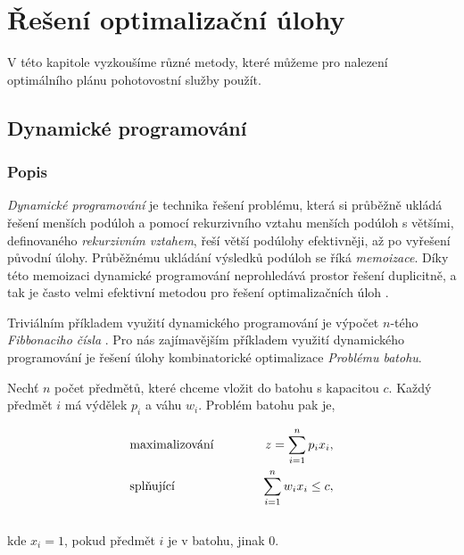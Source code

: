 \theoremstyle{definition}
\newtheorem{exmp}{Příklad}[section]

\chapter{Řešení optimalizační úlohy}\label{chap:reseniOptUloh}

V této kapitole vyzkoušíme různé metody, které můžeme pro nalezení optimálního plánu pohotovostní služby použít.

\section{Dynamické programování}\label{kap:dynamicProgram}

\subsection{Popis}

\textit{Dynamické programování} je technika řešení problému, která si průběžně ukládá řešení menších podúloh a pomocí rekurzivního vztahu menších podúloh s většími,
definovaného \textit{rekurzivním vztahem}, řeší větší podúlohy efektivněji, až po vyřešení původní úlohy. 
Průběžnému ukládání výsledků podúloh se říká \textit{memoizace}.
Díky této memoizaci dynamické programování neprohledává prostor řešení duplicitně, a tak je často velmi efektivní metodou pro řešení optimalizačních úloh \cite{dynamic}.

Triviálním příkladem využití dynamického programování je výpočet $n$-tého \textit{Fibbonaciho čísla} \cite{mares}.
Pro nás zajímavějším příkladem využití dynamického programování je řešení úlohy kombinatorické optimalizace \textit{Problému batohu}.

\begin{definice}
  Nechť $n$ počet předmětů, které chceme vložit do batohu s kapacitou $c$.
  Každý předmět $i$ má výdělek $p_i$ a váhu $w_i$. Problém batohu pak je,

  \begin{alignat*}{2}
    &\normalfont \text{maximalizování} \hspace{30pt} &z = \sum_{i=1}^n p_i x_i, \\
    &\normalfont \text{splňující}   \hspace{30pt} &\sum_{i = 1}^{n} w_i x_i \leq c,
  \end{alignat*}
  \\
  kde $x_i = 1$, pokud předmět $i$ je v batohu, jinak $0$.
  \\
\end{definice}

